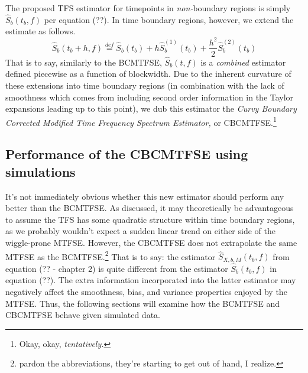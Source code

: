 \documentclass{article}
\begin{document}
The proposed TFS estimator for timepoints in \textit{non-}boundary regions is simply $\hat S_b(t_b,f)$ per equation (??). In time boundary regions, however, we extend the estimate as follows.
\begin{equation}
    \hat S_b (t_b+h,f) \stackrel{def}= 
    \hat S_b(t_b) + h\hat S^{(1)}_b(t_b) + \frac{h^2}2 \hat S^{(2)}_b(t_b)
\end{equation}
That is to say, similarly to the BCMTFSE, $\hat S_b (t,f)$ is a \textit{combined} estimator defined piecewise as a function of blockwidth. Due to the inherent curvature of these extensions into time boundary regions (in combination with the lack of smoothness which comes from including second order information in the Taylor expansions leading up to this point), we dub this estimator the \textit{Curvy Boundary Corrected Modified Time Frequency Spectrum Estimator,} or CBCMTFSE.\footnote{Okay, okay, \textit{tentatively.}} 






\subsection{Performance of the CBCMTFSE using simulations}

It's not immediately obvious whether this new estimator should perform any better than the BCMTFSE. As discussed, it may theoretically be advantageous to assume the TFS has some quadratic structure within time boundary regions, as we probably wouldn't expect a sudden linear trend on either side of the wiggle-prone MTFSE. However, the CBCMTFSE does not extrapolate the same MTFSE as the BCMTFSE.\footnote{pardon the abbreviations, they're starting to get out of hand, I realize.} That is to say: the estimator $\hat S_{X,b,M}(t_b,f)$ from equation (?? - chapter 2) is quite different from the estimator $\hat S_b(t_b,f)$ in equation (??). The extra information incorporated into the latter estimator may negatively affect the smoothness, bias, and variance properties enjoyed by the MTFSE. Thus, the following sections will examine how the BCMTFSE and CBCMTFSE behave given simulated data.
\end{document}
